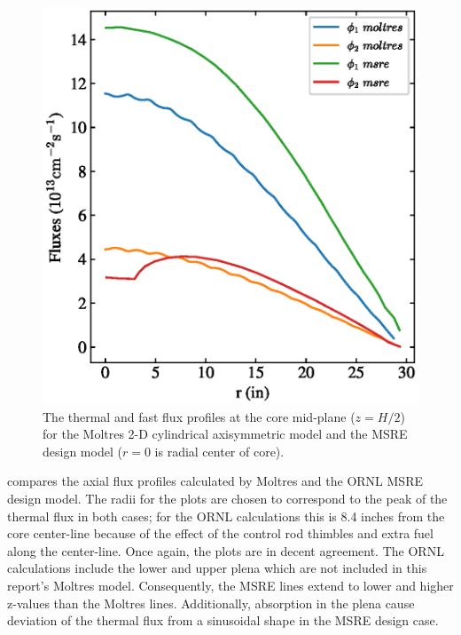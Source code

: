 \documentclass{article}
\makeatletter
\def\maxwidth#1{\ifdim\Gin@nat@width>#1 #1\else\Gin@nat@width\fi}
\makeatother
\begin{document}
\begin{figure}[htpb]
    \centering
      \includegraphics[width=\maxwidth{\textwidth}]{combined_msre_moltres_radial.eps}
      \caption{The thermal and fast flux profiles at the core mid-plane
        ($z=H/2$) for the Moltres 2-D cylindrical axisymmetric model and the
        \gls{MSRE} design model \cite[p. 92]{briggs_molten-salt_1964} ($r=0$ is
        radial center of core).}
    \label{fig:radial_fluxes_compare}
\end{figure}

 compares the axial flux profiles calculated by
Moltres and the \gls{ORNL} \gls{MSRE} design model. The radii for the plots are
chosen to correspond to the peak of the thermal flux in both cases; for the
\gls{ORNL} calculations this is 8.4 inches from the core center-line because of
the effect of the control rod thimbles and extra fuel along the
center-line. Once again, the plots are in decent agreement. The \gls{ORNL}
calculations include the lower and upper plena which are not included in this
report's Moltres model. Consequently, the \gls{MSRE} lines extend to lower and
higher z-values than the Moltres lines. Additionally, absorption
in the plena cause deviation of the thermal flux from a sinusoidal shape in the
\gls{MSRE} design case.
\end{document}
